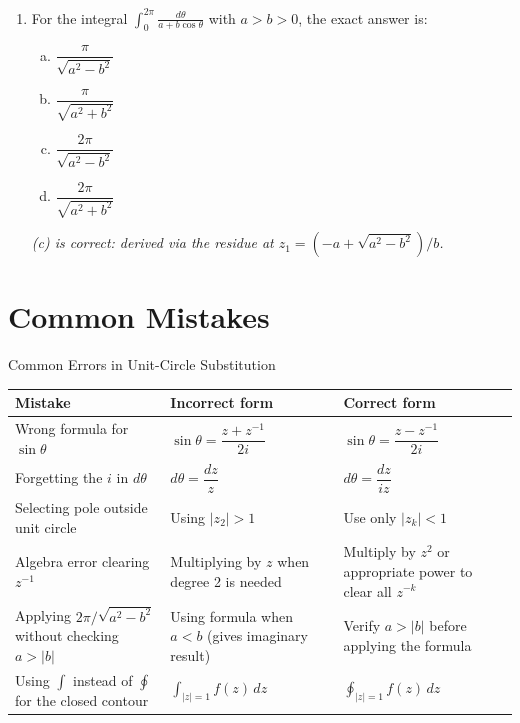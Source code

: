 \documentclass[12pt,a4paper]{article}
\begin{document}
\begin{enumerate}
\item For the integral $\displaystyle\int_0^{2\pi}\frac{d\theta}{a+b\cos\theta}$
      with $a > b > 0$, the exact answer is:
  \begin{enumerate}[(a)]
    \item $\dfrac{\pi}{\sqrt{a^2-b^2}}$
    \item $\dfrac{\pi}{\sqrt{a^2+b^2}}$
    \item \textbf{$\dfrac{2\pi}{\sqrt{a^2-b^2}}$}
    \item $\dfrac{2\pi}{\sqrt{a^2+b^2}}$
  \end{enumerate}
  \textit{(c) is correct: derived via the residue at $z_1 = (-a+\sqrt{a^2-b^2})/b$.}

\end{enumerate}

\section{Common Mistakes}

\begin{mistakebox}{Common Errors in Unit-Circle Substitution}
\begin{tabular}{@{}p{5.5cm}p{4.5cm}p{4.5cm}@{}}
\toprule
\textbf{Mistake} & \textbf{Incorrect form} & \textbf{Correct form} \\
\midrule
Wrong formula for $\sin\theta$
  & $\sin\theta = \dfrac{z+z^{-1}}{2i}$
  & $\sin\theta = \dfrac{z-z^{-1}}{2i}$ \\[8pt]
Forgetting the $i$ in $d\theta$
  & $d\theta = \dfrac{dz}{z}$
  & $d\theta = \dfrac{dz}{iz}$ \\[8pt]
Selecting pole outside unit circle
  & Using $|z_2| > 1$
  & Use only $|z_k| < 1$ \\[8pt]
Algebra error clearing $z^{-1}$
  & Multiplying by $z$ when degree 2 is needed
  & Multiply by $z^2$ or appropriate power to clear all $z^{-k}$ \\[8pt]
Applying $2\pi/\sqrt{a^2-b^2}$ without checking $a > |b|$
  & Using formula when $a < b$ (gives imaginary result)
  & Verify $a > |b|$ before applying the formula \\[8pt]
Using $\int$ instead of $\oint$ for the closed contour
  & $\int_{|z|=1} f(z)\,dz$
  & $\oint_{|z|=1} f(z)\,dz$ \\[8pt]
\bottomrule
\end{tabular}
\end{mistakebox}
\end{document}
